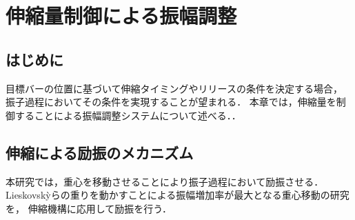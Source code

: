 \chapter[伸縮量制御による振幅調整]%
{伸縮量制御による振幅調整}
        \section{はじめに}

        目標バーの位置に基づいて伸縮タイミングやリリースの条件を決定する場合，
        振子過程においてその条件を実現することが望まれる．
        本章では，伸縮量を制御することによる振幅調整システムについて述べる．．
          
        \section{伸縮による励振のメカニズム}

          本研究では，重心を移動させることにより振子過程において励振させる．
          Lieskovsk{\`y}らの重りを動かすことによる振幅増加率が最大となる重心移動の研究\cite{lieskovsky2023optimal}を，
          伸縮機構に応用して励振を行う．
          
